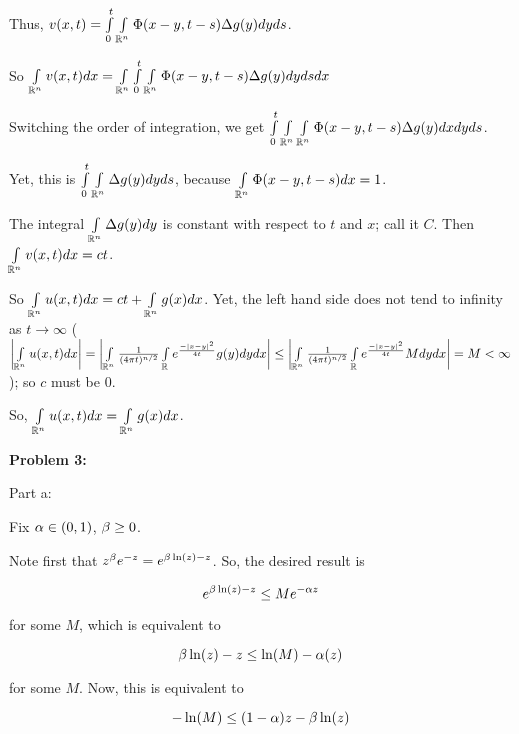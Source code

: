 \documentclass[a4paper,12pt]{article}
\begin{document}
Thus, $v(x,t) = \int\limits_0^t \int\limits_{\mathbb{R}^n} \Phi(x-y,t-s) \Delta g(y) dy ds$.

So $\int\limits_{\mathbb{R}^n} v(x,t) dx = \int\limits_{\mathbb{R}^n} \int\limits_0^t \int\limits_{\mathbb{R}^n} \Phi(x-y,t-s) \Delta g(y) dy ds dx$

Switching the order of integration, we get $ \int\limits_0^t \int\limits_{\mathbb{R}^n} \int\limits_{\mathbb{R}^n} \Phi(x-y,t-s) \Delta g(y) dx dy ds$.

Yet, this is $ \int\limits_0^t \int\limits_{\mathbb{R}^n} \Delta g(y) dy ds$, because $\int\limits_{\mathbb{R}^n} \Phi(x-y,t-s) dx = 1$. 

The integral $\int\limits_{\mathbb{R}^n} \Delta g(y) dy$ is constant with respect to $t$ and $x$; call it $C$. Then $\int\limits_{\mathbb{R}^n} v(x,t) dx = ct$.

So $\int\limits_{\mathbb{R}^n} u(x,t) dx = ct + \int\limits_{\mathbb{R}^n} g(x) dx$. Yet, the left hand side does not tend to infinity as $t \to \infty$ ($\left\lvert \int\limits_{\mathbb{R}^n} u(x,t) dx \right\rvert = \left\lvert \int\limits_{\mathbb{R}^n} \frac{1}{(4\pi t)^{n/2}}\int\limits_{\mathbb{R}} e^{\frac{-\left\lvert x-y \right\rvert^2}{4t}} g(y) dy dx \right\rvert \leq \left\lvert \int\limits_{\mathbb{R}^n} \frac{1}{(4\pi t)^{n/2}}\int\limits_{\mathbb{R}} e^{\frac{-\left\lvert x-y \right\rvert^2}{4t}} M dy dx \right\rvert = M < \infty$); so $c$ must be $0$.


So, $\int\limits_{\mathbb{R}^n} u(x,t) dx = \int\limits_{\mathbb{R}^n} g(x) dx$.

\shunt

{\bf Problem 3:}

Part a:

Fix $\alpha \in (0,1)$, $\beta \geq 0$.

Note first that $z^\beta e^{-z} = e^{\beta \ln(z) - z}$. So, the desired result is

\begin{displaymath}
e^{\beta \ln(z) - z} \leq M e^{-\alpha z}
\end{displaymath}

for some $M$, which is equivalent to

\begin{displaymath}
\beta \ln(z) - z \leq \ln(M) - \alpha(z)
\end{displaymath}

for some $M$. Now, this is equivalent to 

\begin{displaymath}
- \ln(M) \leq (1-\alpha)z - \beta \ln(z)
\end{displaymath}
\end{document}
